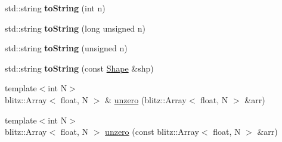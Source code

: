\begin{DoxyCompactItemize}
\item 
\hypertarget{group__CommonFunctions_ga48ded7fea065b110a5bf453d3c30826f}{
std::string {\bfseries toString} (int n)}
\label{group__CommonFunctions_ga48ded7fea065b110a5bf453d3c30826f}

\item 
\hypertarget{group__CommonFunctions_gab48d554a9e19429c5e52eada70dd82ae}{
std::string {\bfseries toString} (long unsigned n)}
\label{group__CommonFunctions_gab48d554a9e19429c5e52eada70dd82ae}

\item 
\hypertarget{group__CommonFunctions_gaf906dc8cbaa06918d9c1230c684b68b0}{
std::string {\bfseries toString} (unsigned n)}
\label{group__CommonFunctions_gaf906dc8cbaa06918d9c1230c684b68b0}

\item 
\hypertarget{group__CommonFunctions_gad609de555ebcdc3b6f79274cfced0f66}{
std::string {\bfseries toString} (const \hyperlink{group__Types_ga777964671cb4315ce8c56c920db031e3}{Shape} \&shp)}
\label{group__CommonFunctions_gad609de555ebcdc3b6f79274cfced0f66}

\item 
{\footnotesize template$<$int N$>$ }\\blitz::Array$<$ float, N $>$ \& \hyperlink{group__CommonFunctions_gad2a3db62f1c560c37c391b9facaab0d9}{unzero} (blitz::Array$<$ float, N $>$ \&arr)
\item 
{\footnotesize template$<$int N$>$ }\\blitz::Array$<$ float, N $>$ \hyperlink{group__CommonFunctions_ga829ba4ebb912ca1f1825db3930396a0d}{unzero} (const blitz::Array$<$ float, N $>$ \&arr)
\end{DoxyCompactItemize}

